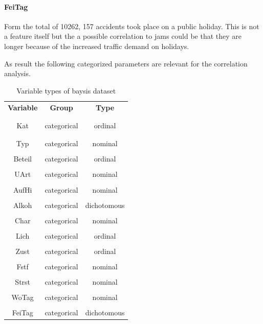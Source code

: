\documentclass[a4paper,12pt]{report}
\begin{document}
\paragraph{FeiTag}
Form the total of 10262, 157 accidents took place on a public holiday. This is not a feature itself but the a possible correlation to jams could be that they are longer because of the increased traffic demand on holidays.

\bigskip

As result the following categorized parameters are relevant for the correlation analysis.
	
\begin{table}[ht]
	\centering
	\begin{tabular}{c|c|c}
		\textbf{Variable} 	& \textbf{Group} 	& \textbf{Type} 		\\
		\\[-1em]
		\hline
		\\[-1em]
		Kat  		& categorical 	& ordinal 	\\
		\\[-1em]
		\hline
		\\[-1em]
		Typ 		& categorical 	& nominal	\\
		\hline
		\\[-1em]
		Beteil 		& categorical 	& ordinal	\\
		\hline
		\\[-1em]
		UArt 		& categorical 	& nominal	\\
		\hline
		\\[-1em]
		AufHi 		& categorical 	& nominal	\\
		\hline
		\\[-1em]
		Alkoh 		& categorical 	& dichotomous	\\
		\hline
		\\[-1em]
		Char 		& categorical 	& nominal	\\
		\hline
		\\[-1em]
		Lich 		& categorical 	& ordinal	\\
		\hline
		\\[-1em]
		Zust 		& categorical 	& ordinal	\\
		\hline
		\\[-1em]
		Fstf 		& categorical 	& nominal	\\
		\hline
		\\[-1em]
		Strst 		& categorical 	& nominal	\\
		\hline
		\\[-1em]
		WoTag 		& categorical 	& nominal	\\
		\hline
		\\[-1em]
		FeiTag 		& categorical 	& dichotomous	\\
	\end{tabular}
	\caption{\label{tab:table-name}Variable types of \acrshort{baysis} dataset}
\end{table}
\end{document}
